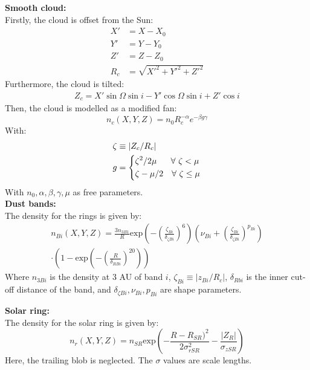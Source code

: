 \documentclass[a4paper,10pt]{article}
\begin{document}
\textbf{Smooth cloud:}\\
Firstly, the cloud is offset from the Sun:
\begin{align}
 X' &= X - X_0 \\
 Y' &= Y - Y_0 \\
 Z' &= Z - Z_0 \\
 R_c &= \sqrt{X'^2 + Y'^2 + Z'^2}
\end{align}
Furthermore, the cloud is tilted:
\begin{align}
 Z_c = X' \sin \Omega \sin i - Y' \cos \Omega \sin i + Z' \cos i
\end{align}
Then, the cloud is modelled as a modified fan:
\begin{equation}
 n_c(X, Y, Z) = n_0 R_c^{-\alpha} e^{-\beta g \gamma}
\end{equation}
With:
\begin{align}
 \zeta &\equiv |Z_c / R_c | \\
 g &= \begin{dcases}\zeta^2 / 2\mu~~~~~\forall~\zeta < \mu \\ \zeta - \mu/2~~~\forall~\zeta \leq \mu \end{dcases}
\end{align}
With $n_0, \alpha, \beta, \gamma, \mu$ as free parameters.\\

\textbf{Dust bands:}\\
The density for the rings is given by:
\begin{equation}
\begin{aligned}
 n_{Bi}(X, Y, Z) = \frac{3n_{3B1}}{R}\mathrm{exp}\left(-\left(\frac{\zeta_{Bi}}{\delta_{\zeta Bi}}\right)^6\right)\left(\nu_{Bi}+\left(\frac{\zeta_{Bi}}{\delta_{\zeta Bi}}\right)^{p_{Bi}}\right)\\ \cdot\left(1-\mathrm{exp}\left(-\left(\frac{R}{\delta_{RBi}}\right)^{20}\right)\right)
 \end{aligned}
\end{equation}
Where $n_{3Bi}$ is the density at 3 AU of band $i$, $\zeta_{Bi} \equiv |z_{Bi} / R_c |$, $\delta_{Rbi}$ is the inner cut-off distance of the band, and $\delta_{\zeta Bi}, \nu_{Bi}, p_{Bi}$ are shape parameters.

\textbf{Solar ring:}\\
The density for the solar ring is given by:
\begin{equation}
 n_r(X, Y, Z) = n_{SR} \mathrm{exp}\left(-\frac{R-R_{SR})^2}{2 \sigma_{rSR}^2} - \frac{|Z_R|}{\sigma_{zSR}}\right)
\end{equation}
Here, the trailing blob is neglected. The $\sigma$ values are scale lengths.
\end{document}
